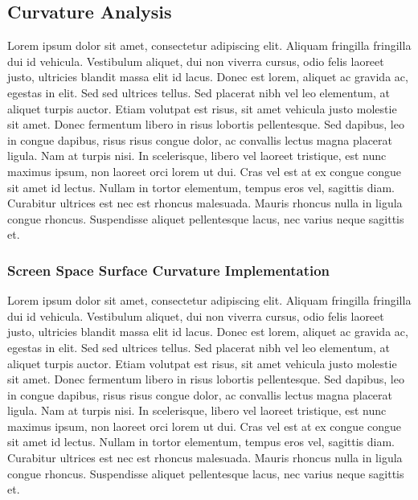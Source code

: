 \subsection{Curvature Analysis}
Lorem ipsum dolor sit amet, consectetur adipiscing elit. Aliquam fringilla fringilla dui id vehicula. Vestibulum aliquet, dui non viverra cursus, odio felis laoreet justo, ultricies blandit massa elit id lacus. Donec est lorem, aliquet ac gravida ac, egestas in elit. Sed sed ultrices tellus. Sed placerat nibh vel leo elementum, at aliquet turpis auctor. Etiam volutpat est risus, sit amet vehicula justo molestie sit amet. Donec fermentum libero in risus lobortis pellentesque. Sed dapibus, leo in congue dapibus, risus risus congue dolor, ac convallis lectus magna placerat ligula. Nam at turpis nisi. In scelerisque, libero vel laoreet tristique, est nunc maximus ipsum, non laoreet orci lorem ut dui. Cras vel est at ex congue congue sit amet id lectus. Nullam in tortor elementum, tempus eros vel, sagittis diam. Curabitur ultrices est nec est rhoncus malesuada. Mauris rhoncus nulla in ligula congue rhoncus. Suspendisse aliquet pellentesque lacus, nec varius neque sagittis et.
\subsubsection{Screen Space Surface Curvature Implementation}
Lorem ipsum dolor sit amet, consectetur adipiscing elit. Aliquam fringilla fringilla dui id vehicula. Vestibulum aliquet, dui non viverra cursus, odio felis laoreet justo, ultricies blandit massa elit id lacus. Donec est lorem, aliquet ac gravida ac, egestas in elit. Sed sed ultrices tellus. Sed placerat nibh vel leo elementum, at aliquet turpis auctor. Etiam volutpat est risus, sit amet vehicula justo molestie sit amet. Donec fermentum libero in risus lobortis pellentesque. Sed dapibus, leo in congue dapibus, risus risus congue dolor, ac convallis lectus magna placerat ligula. Nam at turpis nisi. In scelerisque, libero vel laoreet tristique, est nunc maximus ipsum, non laoreet orci lorem ut dui. Cras vel est at ex congue congue sit amet id lectus. Nullam in tortor elementum, tempus eros vel, sagittis diam. Curabitur ultrices est nec est rhoncus malesuada. Mauris rhoncus nulla in ligula congue rhoncus. Suspendisse aliquet pellentesque lacus, nec varius neque sagittis et.